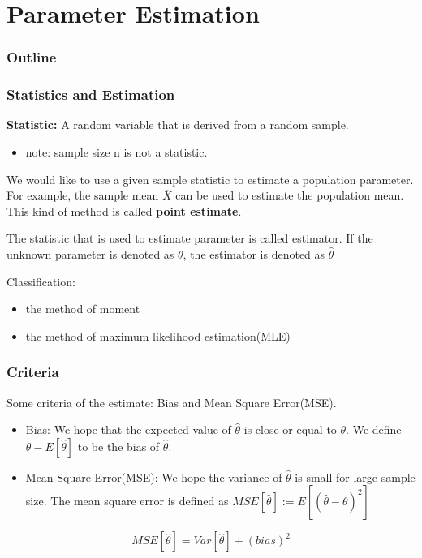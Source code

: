 \documentclass{beamer}
\begin{document}
\section{Parameter Estimation}
\begin{frame}
    \frametitle{Outline}
    \tableofcontents[currentsection]
\end{frame}
\begin{frame}
    \frametitle{Statistics and Estimation}

    \textbf{Statistic:} A random variable that is derived from a random sample.
    \begin{itemize}
        \item note: sample size n is not a statistic.
    \end{itemize}
    We would like to use a given sample statistic to estimate a population
    parameter. For example, the sample mean $\overline{X}$ can be used to estimate the population mean. This kind of method is called \textbf{point estimate}.\par
    The statistic that is used to estimate parameter is called estimator. If the unknown parameter is denoted as $\theta$, the estimator is denoted as $\hat{\theta}$\par
    Classification:
    \begin{itemize}
        \item the method of moment
        \item the method of maximum likelihood estimation(MLE)
    \end{itemize}


\end{frame}

\begin{frame}
    \frametitle{Criteria}

    Some criteria of the estimate: Bias and Mean Square Error(MSE).
    \begin{itemize}
        \item Bias: We hope that the expected value of $\hat{\theta}$ is close or equal to $\theta$. We define $\theta-E[\hat{\theta}]$ to be the bias of $\hat{\theta}$.
        \item Mean Square Error(MSE): We hope the variance of $\hat{\theta}$ is small for large sample size. The mean square error is defined as $MSE[\hat{\theta}]:=E[(\hat{\theta}-\theta)^2]$
    \end{itemize}
    \[MSE[\hat{\theta}]=Var[\hat{\theta}]+(bias)^2\]

\end{frame}
\end{document}
